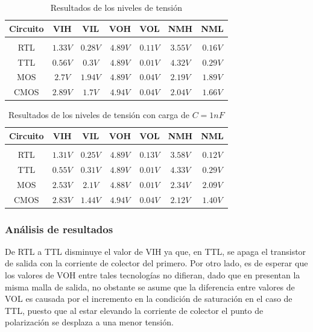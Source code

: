 \begin{table}[H]
    \centering
    \begin{tabular}{c c c c c c c}
        Circuito & VIH & VIL & VOH & VOL & NMH & NML \\
        \hline \\
        RTL & $1.33V$ & $0.28V$ & $4.89V$ & $0.11V$ & $3.55V$ & $0.16V$ \\
        TTL & $0.56V$ & $0.3V$ & $4.89V$ & $0.01V$ & $4.32V$ & $0.29V$ \\
        MOS & $2.7V$ & $1.94V$ & $4.89V$ & $0.04V$ & $2.19V$ & $1.89V$ \\
        CMOS & $2.89V$ & $1.7V$ & $4.94V$ & $0.04V$ & $2.04V$ & $1.66V$ \\
        \hline
    \end{tabular} 
    \caption{Resultados de los niveles de tensi\'on}
\end{table}

\begin{table}[H]
    \centering
    \begin{tabular}{c c c c c c c}
        Circuito & VIH & VIL & VOH & VOL & NMH & NML \\
        \hline \\
        RTL & $1.31V$ & $0.25V$ & $4.89V$ & $0.13V$ & $3.58V$ & $0.12V$ \\
        TTL & $0.55V$ & $0.31V$ & $4.89V$ & $0.01V$ & $4.33V$ & $0.29V$ \\
        MOS & $2.53V$ & $2.1V$ & $4.88V$ & $0.01V$ & $2.34V$ & $2.09V$ \\
        CMOS & $2.83V$ & $1.44V$ & $4.94V$ & $0.04V$ & $2.12V$ & $1.40V$ \\
        \hline
    \end{tabular} 
    \caption{Resultados de los niveles de tensi\'on con carga de $C = 1nF$}
    \label{table:voltage_levels_charged}
\end{table}

\subsubsection{An\'alisis de resultados}
De RTL a TTL disminuye el valor de VIH ya que, en TTL, se apaga el transistor de salida con la corriente de colector del primero. Por otro lado, es de esperar que los valores de VOH entre tales tecnolog\'ias no difieran,
dado que en presentan la misma malla de salida, no obstante se asume que la diferencia entre valores de VOL es causada por el incremento en la condici\'on
de saturaci\'on en el caso de TTL, puesto que al estar elevando la corriente de colector el punto de polarizaci\'on se desplaza a una menor tensi\'on.

